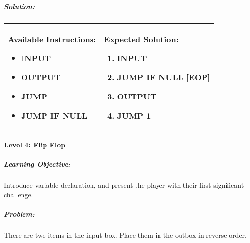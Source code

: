 \subparagraph{Solution:} 
\begin{center}
    \begin{tabular}{ | m{5cm} | m{9cm} | } 
        \hline
            \textbf{Available Instructions:} 
            \begin{itemize}
                \setlength\itemsep{-.35em}
                \item INPUT
                \item OUTPUT
                \item JUMP
                \item JUMP IF NULL
            \end{itemize}& 
            \textbf{Expected Solution:} 
            \begin{enumerate}
                \setlength\itemsep{-.35em}
                \item INPUT
                \item JUMP IF NULL [EOP]
                \item OUTPUT
                \item JUMP 1
            \end{enumerate}
            \\
        \hline
    \end{tabular}
\end{center}

\paragraph{Level 4: Flip Flop}
\subparagraph{Learning Objective:} Introduce variable declaration, and present the player with their first significant challenge.

\subparagraph{Problem:} There are two items in the input box. Place them in the outbox in reverse order.

